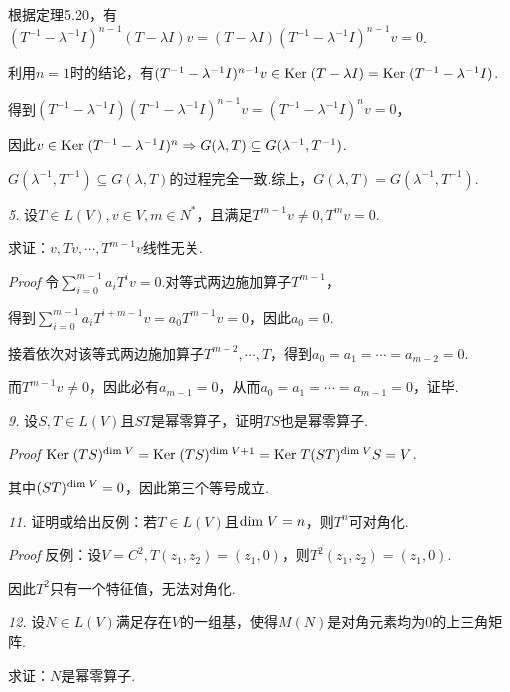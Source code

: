 根据定理5.20，有\((T^{-1}-\lambda^{-1} I)^{n-1}(T-\lambda I)v=(T-\lambda I)(T^{-1}-\lambda^{-1} I)^{n-1}v=0\).

利用\(n=1\)时的结论，有\((T^{-1}-\lambda^{-1} I)^{n-1}v \in \mathrm{Ker \;} (T-\lambda I)=\mathrm{Ker \;} (T^{-1}-\lambda^{-1} I)\).

得到\((T^{-1}-\lambda^{-1} I)(T^{-1}-\lambda^{-1} I)^{n-1}v=(T^{-1}-\lambda^{-1} I)^n v=0\)，

因此\(v \in \mathrm{Ker \;} (T^{-1}-\lambda^{-1} I)^n \Rightarrow G(\lambda,T) \subseteq G(\lambda^{-1},T^{-1})\).

\(G(\lambda^{-1},T^{-1}) \subseteq G(\lambda,T)\)的过程完全一致.综上，\(G(\lambda,T)=G(\lambda^{-1},T^{-1})\).

\hspace*{\fill}

\textit{5.}
设\(T \in L(V),v \in V,m \in N^*\)，且满足\(T^{m-1}v \ne 0,T^m v=0\).

求证：\(v,Tv,\cdots,T^{m-1}v\)线性无关.

\textit{Proof}
令\(\sum_{i=0}^{m-1} a_iT^i v=0\).对等式两边施加算子\(T^{m-1}\)，

得到\(\sum_{i=0}^{m-1} a_iT^{i+m-1} v=a_0T^{m-1} v=0\)，因此\(a_0=0\).

接着依次对该等式两边施加算子\(T^{m-2},\cdots,T\)，得到\(a_0=a_1=\cdots=a_{m-2}=0\).

而\(T^{m-1}v \ne 0\)，因此必有\(a_{m-1}=0\)，从而\(a_0=a_1=\cdots=a_{m-1}=0\)，证毕.

\hspace*{\fill}

\textit{9.}
设\(S,T \in L(V)\)且\(ST\)是幂零算子，证明\(TS\)也是幂零算子.

\textit{Proof}
\(\mathrm{Ker \;} (TS)^{\mathrm{dim \;} V}=\mathrm{Ker \;} (TS)^{\mathrm{dim \;} V+1}=\mathrm{Ker \;} T(ST)^{\mathrm{dim \;} V}S=V\).

其中\((ST)^{\mathrm{dim \;} V}=0\)，因此第三个等号成立.

\hspace*{\fill}

\textit{11.}
证明或给出反例：若\(T \in L(V)\)且\(\mathrm{dim \;} V=n\)，则\(T^n\)可对角化.

\textit{Proof}
反例：设\(V=C^2,T(z_1,z_2)=(z_1,0)\)，则\(T^2(z_1,z_2)=(z_1,0)\).

因此\(T^2\)只有一个特征值，无法对角化.

\newpage

\textit{12.}
设\(N \in L(V)\)满足存在\(V\)的一组基，使得\(M(N)\)是对角元素均为\(0\)的上三角矩阵.

求证：\(N\)是幂零算子.

